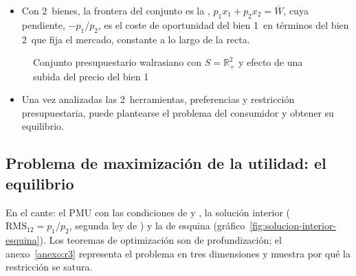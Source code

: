 \documentclass[11pt]{article}
\begin{document}
\begin{itemize}
\begin{itemize}
\begin{enumerate}[label=(\roman*)]
    \item es \emph{acotado} si todos los precios son estrictamente positivos ($\vect{p}\gg\vect{0}$);\footnote{Cerrado y acotado en $\mathbb{R}^n$ equivale a \emph{compacto} (teorema de -).}
    \item es \emph{convexo}: contiene toda combinación convexa de 2~de sus cestas.
    \end{enumerate}
  \end{itemize}
\item Con 2~bienes, la frontera del conjunto es la , $p_1x_1+p_2x_2=\overline{W}$, cuya pendiente, $-p_1/p_2$, es el coste de oportunidad del bien 1~en términos del bien 2~que fija el mercado, constante a lo largo de la recta.
\end{itemize}

\begin{figure}[H]
\centering
\caption{Conjunto presupuestario walrasiano con $S=\mathbb{R}^2_+$ y efecto de una subida del precio del bien 1}\label{fig:conjunto-presupuestario}
\end{figure}

\begin{itemize}
\item Una vez analizadas las 2~herramientas, preferencias y restricción presupuestaria, puede plantearse el problema del consumidor y obtener su equilibrio.
\end{itemize}


\subsection{Problema de maximización de la utilidad: el equilibrio}\label{sec:problema-maximizacion-utilidad}

\begin{notaopositor}
En el cante: el PMU con las condiciones de  y , la solución interior ($\mathrm{RMS}_{12}=p_1/p_2$, segunda ley de ) y la de esquina (gráfico~\ref{fig:solucion-interior-esquina}). Los teoremas de optimización son de profundización; el anexo~\ref{anexo:r3} representa el problema en tres dimensiones y muestra por qué la restricción se satura.
\end{notaopositor}
\end{document}
